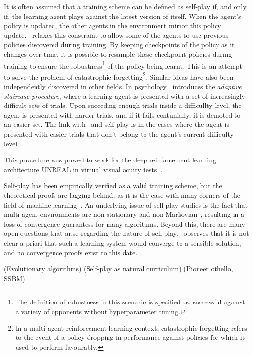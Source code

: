 \documentclass{../main.tex}{}
\begin{document}
It is often assumed that a training scheme can be defined as self-play if, and only if, the learning agent plays against the latest version of itself. When the agent's policy is updated, the other agents in the environment mirror this policy update.~\citep{Bansal2017} relaxes this constraint to allow some of the agents to use previous policies discovered during training. By keeping checkpoints of the policy as it changes over time, it is possible to resample these checkpoint policies during training to ensure the robustness\footnote{The definition of robustness in this scenario is specified as: successful against a variety of opponents without hyperparameter tuning.} of the policy being learnt. This is an attempt to solve the problem of catastrophic forgetting\footnote{In a multi-agent reinforcement learning context, catastrophic forgetting refers to the event of a policy dropping in performance against policies for which it used to perform favourably.}. Similar ideas have also been independently discovered in other fields. In psychology~\cite{Treutwein1995} introduces the \textit{adaptive staircase procedure}, where a learning agent is presented with a set of increasingly difficult sets of trials. Upon succeding enough trials inside a difficullty level, the agent is presented with harder trials, and if it fails contunially, it is demoted to an easier set. The link with~\citep{Bansal2017} and self-play is in the cases where the agent is presented with easier trials that don't belong to the agent's current difficulty level,

This procedure was proved to work for the deep reinforcement learning architecture UNREAL \citep{Beattie2016} in virtual visual acuity tests~\citep{Leibo2018}.

Self-play has been empirically verified as a valid training scheme, but the theoretical proofs are lagging behind, as it is the case with many corners of the field of machine learning~\citep{Henderson2017, Lipton2018}. An underlying issue of self-play studies is the fact that multi-agent environments are non-stationary and non-Markovian~\citep{Laurent2011}, resulting in a loss of convergence guarantess for many algorithms. Beyond this, there are many open questions that arise regarding the nature of self-play.~\cite{Tesauro1992} observes that it is not clear a priori that such a learning system would converge to a sensible solution, and no convergence proofs exist to this date. 

(Evolutionary algorithms)
(Self-play as natural curriculum)
(Pioneer othello, SSBM)
\end{document}
